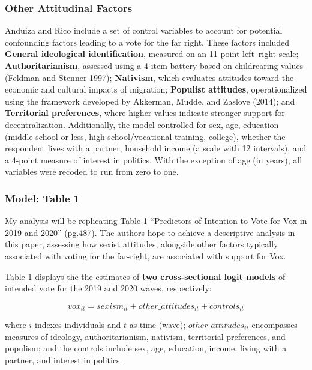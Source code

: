 \documentclass[
  letterpaper,
  DIV=11,
  numbers=noendperiod]{scrartcl}
\begin{document}
\subsubsection{Other Attitudinal
Factors}\label{other-attitudinal-factors}

Anduiza and Rico include a set of control variables to account for
potential confounding factors leading to a vote for the far right. These
factors included \textbf{General ideological identification}, measured
on an 11-point left--right scale; \textbf{Authoritarianism}, assessed
using a 4-item battery based on childrearing values (Feldman and Stenner
1997); \textbf{Nativism}, which evaluates attitudes toward the economic
and cultural impacts of migration; \textbf{Populist attitudes},
operationalized using the framework developed by Akkerman, Mudde, and
Zaslove (2014); and \textbf{Territorial preferences}, where higher
values indicate stronger support for decentralization. Additionally, the
model controlled for sex, age, education (middle school or less, high
school/vocational training, college), whether the respondent lives with
a partner, household income (a scale with 12 intervals), and a 4-point
measure of interest in politics. With the exception of age (in years),
all variables were recoded to run from zero to one.

\subsubsection{Model: Table 1}\label{model-table-1}

My analysis will be replicating Table 1 ``Predictors of Intention to
Vote for Vox in 2019 and 2020'' (pg.487). The authors hope to achieve a
descriptive analysis in this paper, assessing how sexist attitudes,
alongside other factors typically associated with voting for the
far-right, are associated with support for Vox.

Table 1 displays the the estimates of \textbf{two cross-sectional logit
models} of intended vote for the 2019 and 2020 waves, respectively:

\[
vox_{it} = sexism_{it} + other\_attitudes_{it} + controls_{it}
\]

where \(i\) indexes individuals and \(t\) as time (wave);
\(other\_attitudes_{it}\) encompasses measures of ideology,
authoritarianism, nativism, territorial preferences, and populism; and
the controls include sex, age, education, income, living with a partner,
and interest in politics.
\end{document}
